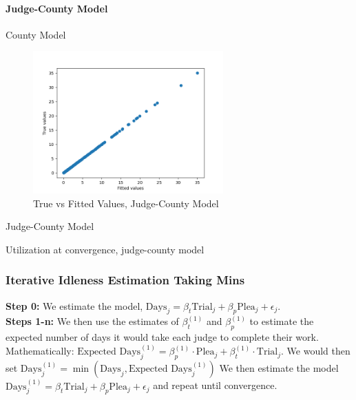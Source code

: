 \documentclass[11pt, oneside]{article}   	%
\theoremstyle{ModifiedStyle}
\begin{document}
			\paragraph{Judge-County Model}

				\begin{table}[H]
					\centering
					\caption{County Model}
					
				\end{table}

				\begin{figure}[H]
					\centering
					\includegraphics[width=0.65\textwidth]{../../output/figures/Exploration/fit_utilization_JudgeIDCounty}
					\caption{True vs Fitted Values, Judge-County Model}
				\end{figure}

				\begin{table}[H]
					\centering
					\caption{Judge-County Model}
					
				\end{table}

				\begin{table}[H]
					\centering
					\small
					\caption{Utilization at convergence, judge-county model}
					
				\end{table}

	  \subsubsection{Iterative Idleness Estimation Taking Mins}
			\textbf{Step 0:} We estimate the model, $\text{Days}_j = \beta_t\text{Trial}_j + \beta_p\text{Plea}_j +\epsilon_j$. \\

		  \noindent \textbf{Steps 1-n:} We then use the estimates of $\beta^{(1)}_t$ and $\beta^{(1)}_p$ to estimate the expected number
		  of days it would take each judge to complete their work. Mathematically: $\text{Expected Days}^{(1)}_j = \beta^{(1)}_p \cdot \text{Plea}_j + \beta^{(1)}_t \cdot \text{Trial}_j$.
		  We would then set $\text{Days}^{(1)}_j = \min(\text{Days}_j,\text{Expected Days}^{(1)}_j)$ We then estimate the model $\text{Days}^{(1)}_j = \beta_t\text{Trial}_j + \beta_p\text{Plea}_j +\epsilon_j$ and repeat until convergence.
\end{document}
